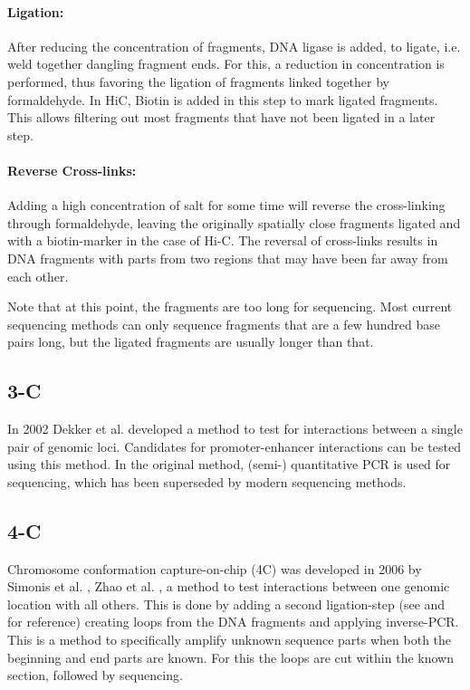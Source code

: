 \paragraph{Ligation:}\label{sec:ligation}
After reducing the concentration of fragments, DNA ligase is added, to ligate,
i.e. weld together dangling fragment ends. For this, a reduction in
concentration is performed, thus favoring the ligation of fragments linked
together by formaldehyde.
In HiC, Biotin is added in this step to mark ligated fragments. This allows
filtering out most fragments that have not been ligated in a later step.




\paragraph{Reverse Cross-links:}\label{sec:revcrosslink}
Adding a high concentration of salt for some time will reverse the
cross-linking through formaldehyde, leaving the originally spatially close
fragments ligated and with a biotin-marker in the case of Hi-C.
The reversal of cross-links results in DNA fragments with parts from two
regions that may have been far away from each other.

Note that at this point, the fragments are too long for sequencing. Most
current sequencing methods can only sequence fragments that are a few hundred
base pairs long, but the ligated fragments are usually longer than that.




\subsection{3-C}\label{sec:3C}

In 2002 Dekker et al. \cite{dekker2002capturing} developed a method to test for
interactions between a single pair of genomic loci. Candidates for
promoter-enhancer interactions can be tested using this method.
In the original method, (semi-) quantitative PCR is used for sequencing, which
has been superseded by modern sequencing methods.


\subsection{4-C}\label{sec:4C}

Chromosome conformation capture-on-chip (4C) was developed in 2006 by Simonis
et al. \cite{simonis2006nuclear}, Zhao et al. \cite{zhao2006circular}, a method
to test interactions between one genomic location with all others. This is done
by adding a second ligation-step (see  and 
for reference) creating loops from the DNA fragments and applying inverse-PCR.
This is a method to specifically amplify unknown sequence parts when both
the beginning and end parts are known. For this the loops are cut within the
known section, followed by sequencing.


